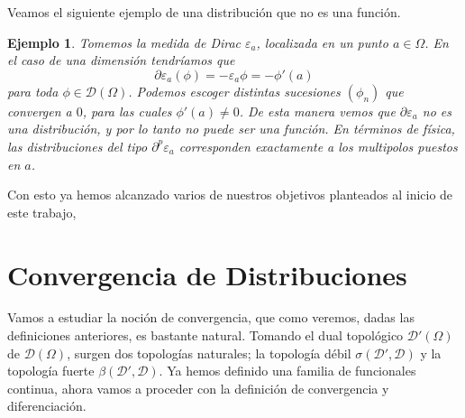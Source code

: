 \documentclass[letter,12pt]{article}
\newtheorem{example}[theorem]{Ejemplo}
\begin{document}
Veamos el siguiente ejemplo de una distribución que no es una función.

\begin{example}\normalfont
	Tomemos la medida de Dirac $ \varepsilon_a $, localizada en un punto $ a \in \Omega $.
	En el caso de una dimensión tendríamos que
	\[ \partial \varepsilon_a(\phi) = - \varepsilon_a{\phi} = - \phi'(a) \]
	para toda $ \phi \in \mathscr{D}(\Omega) $. Podemos escoger distintas sucesiones
	$ (\phi_n) $ que convergen a $ 0 $, para las cuales $ \phi'(a) \neq 0 $.
	De esta manera vemos que $ \partial \varepsilon_a $ no es una distribución, 
	y por lo tanto no puede ser una función. En términos de física, las distribuciones
	del tipo $ \partial^{p}\varepsilon_a  $ corresponden exactamente a los
	multipolos puestos en $ a $.
\end{example}
Con esto ya hemos alcanzado varios de nuestros objetivos planteados al inicio de este trabajo,

\section{Convergencia de Distribuciones}
Vamos a estudiar la noción de convergencia, que como veremos, dadas las definiciones
anteriores, es bastante natural. Tomando el dual topológico $ \mathscr{D}'(\Omega) $
de $ \mathscr{D}(\Omega) $, surgen dos topologías naturales; la topología débil
$ \sigma(\mathscr{D}', \mathscr{D}) $ y la topología fuerte 
$ \beta(\mathscr{D}', \mathscr{D}) $.
Ya hemos definido una familia de funcionales continua, ahora vamos a proceder con
la definición de convergencia y diferenciación.
\cite{Rudin}
\cite{Edwards}
\cite{Halperin}
\cite{Strichartz}
\printbibliography
\end{document}
